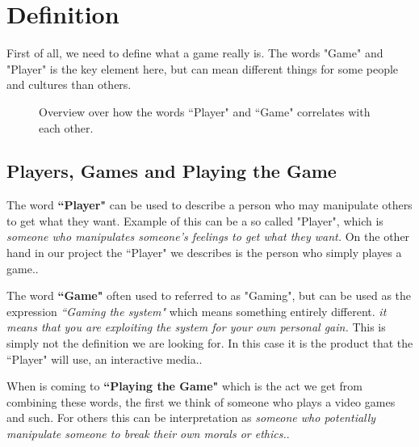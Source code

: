 \section{Definition}
\label{sec:Definition}
First of all, we need to define what a game really is.
The words "Game" and "Player" is the key element here, but can mean different things for some people and cultures than others.

\begin{figure}[h!]
\centering
{}
\caption{Overview over how the words ``Player" and ``Game" correlates with each other.}
\medskip
\small\em
\label{fig:playerGame}
\end{figure}

\subsection{Players, Games and Playing the Game}
\label{sec:PlayersGamesAndPlayingGames}
The word \textbf{``Player"} can be used to describe a person who may manipulate others to get what they want. Example of this can be a so called "Player", which is \textit{someone who manipulates someone's feelings to get what they want.} On the other hand in our project the ``Player" we describes is the person who simply playes a game.\cite[P.~19-20]{RealityIsBroken}.

The word \textbf{``Game"} often used to referred to as "Gaming", but can be used as the expression \textit{``Gaming the system"} which means something entirely different. \textit{it means that you are exploiting the system for your own personal gain.} This is simply not the definition we are looking for. In this case it is the product that the ``Player" will use, an interactive media.\cite[P.~19-20]{RealityIsBroken}.

When is coming to \textbf{``Playing the Game"} which is the act we get from combining these words, the first we think of someone who plays a video games and such. For others this can be interpretation as \textit{someone who potentially manipulate someone to break their own morals or ethics.}\cite[P.~19-20]{RealityIsBroken}. 

